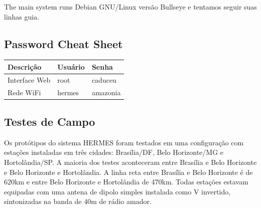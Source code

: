 \documentclass[11pt,a4paper]{article}
\begin{document}
    The main system runs Debian GNU/Linux versão Bullseye e tentamos seguir suas linhas guia. 

\subsection{Password Cheat Sheet}
\label{passwords}


\begin{table}[h]

\centering
\begin{tabular}{|l|l|l|}
\hline
Descrição & Usuário & Senha  \\ \hline
Interface Web & root  & caduceu \\  \hline
Rede WiFi & hermes & amazonia \\ \hline
\end{tabular}
\end{table}

\subsection{Testes de Campo}
\label{apx_field_trials}

Os protótipos do sistema HERMES foram testados em uma configuração com estações instaladas em três cidades: Brasília/DF, Belo Horizonte/MG e Hortolândia/SP. A maioria dos testes aconteceram entre Brasília e Belo Horizonte e Belo Horizonte e Hortolândia. A linha reta entre Brasília e Belo Horizonte é de 620km e entre Belo Horizonte e Hortolândia de 470km. Todas estações estavam equipadas com uma antena de dipolo simples instalada como V invertido, sintonizadas na banda de 40m de rádio amador.

\end{document}
